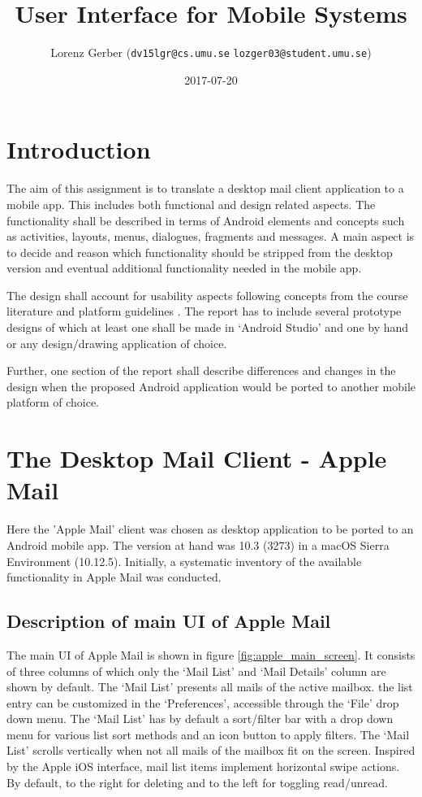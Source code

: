 \documentclass[a4paper,11pt,twoside]{article}
\title{User Interface for Mobile Systems}
\author{Lorenz Gerber ({\tt{dv15lgr@cs.umu.se}} {\tt{lozger03@student.umu.se}})}
\date{2017-07-20}
\begin{document}
\lstset{language=C}
\maketitle
\thispagestyle{empty}
\newpage
\tableofcontents
\thispagestyle{empty}
\newpage

\clearpage
{}

\section{Introduction}
The aim of this assignment is to translate a desktop mail client application to
a mobile app. This includes both functional and design related aspects. The
functionality shall be described in terms of Android elements and concepts such
as activities, layouts, menus, dialogues, fragments and messages. A main aspect is
to decide and reason which functionality should be stripped from the desktop version
and eventual additional functionality needed in the mobile app.

The design shall account for usability aspects following concepts from the
course literature \cite{clark2015} and platform guidelines \cite{materialdesign}.
The report has to include several prototype designs of which at least one shall be
made in `Android Studio' and one by hand or any design/drawing application of choice.

Further, one section of the report shall describe differences and changes in the
design when the proposed Android application would be ported to another mobile
platform of choice.

\section{The Desktop Mail Client - Apple Mail}
Here the 'Apple Mail' client was chosen as desktop application to be ported to
an Android mobile app. The version at hand was 10.3 (3273) in a macOS Sierra
Environment (10.12.5). Initially, a systematic inventory of the available
functionality in Apple Mail was conducted.

\subsection{Description of main UI of Apple Mail}
The main UI of Apple Mail is shown in figure \ref{fig:apple_main_screen}.
It consists of three columns of which only the `Mail List' and `Mail Details'
column are shown by default. The `Mail List' presents all mails of the active mailbox.
the list entry can be customized in the `Preferences', accessible through the `File'
drop down menu. The `Mail List' has by default a sort/filter bar with a drop down
menu for various list sort methods and an icon button to apply filters. The `Mail
List' scrolls vertically when not all mails of the mailbox fit on the screen.
Inspired by the Apple iOS interface, mail list items implement horizontal swipe
actions. By default, to the right for deleting and to the left for toggling
read/unread.
\end{document}

